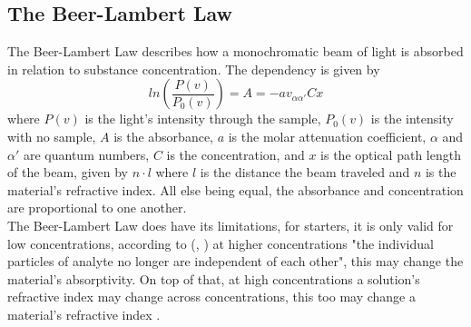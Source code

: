 \documentclass[reprint,amsmath,amssymb,aps, prl,superscriptaddress]{revtex4-2}
\begin{document}
\subsection{The Beer-Lambert Law}
The Beer-Lambert Law describes how a monochromatic beam of light is absorbed in relation to substance concentration. The dependency is given by
\begin{equation} \label{eq:BeerLambert}
ln\left(\frac{P(v)}{P_{0}(v)}\right)=A=-av_{\alpha\alpha'}Cx
\end{equation}
where $P(v)$ is the light's intensity through the sample, $P_{0}(v)$ is the intensity with no sample, $A$ is the absorbance, $a$ is the molar attenuation coefficient, $\alpha$ and $\alpha'$ are quantum numbers, $C$ is the concentration, and $x$ is the optical path length of the beam, given by $n\cdot l$ where $l$ is the distance the beam traveled and $n$ is the material's refractive index. All else being equal, the absorbance and concentration are proportional to one another. \\
The Beer-Lambert Law does have its limitations, for starters, it is only valid for low concentrations, according to (, \cite{2020Beer}) at higher concentrations "the individual particles of analyte no longer are independent of each other", this may change the material's absorptivity. On top of that, at high concentrations a solution's refractive index may change across concentrations, this too may change a material's refractive index \cite{2020Beer}.
\end{document}
